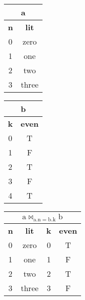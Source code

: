 \documentclass[11pt]{article}
\begin{document}
\begin{figure}
  \def\arraystretch{1.2}
  \begin{subfigure}{0.2\textwidth}
    \centering
      \begin{tabular}{|c|c|}
        \hline
        \multicolumn{2}{|c|}{a}\\
        \hline
        \textbf{n} & \textbf{lit} \\
        \hline
        0 & zero\\
        \hline
        1 & one\\
        \hline
        2 & two\\
        \hline
        3 & three\\
        \hline
      \end{tabular}
  \end{subfigure}
  \hfill
  \begin{subfigure}{0.2\textwidth}
    \centering
      \begin{tabular}{|c|c|}
        \hline
        \multicolumn{2}{|c|}{b}\\
        \hline
        \textbf{k} & \textbf{even} \\
        \hline
        0 & \textsf{T}\\
        \hline
        1 & \textsf{F}\\
        \hline
        2 & \textsf{T}\\
        \hline
        3 & \textsf{F}\\
        \hline
        4 & \textsf{T}\\
        \hline
      \end{tabular}
  \end{subfigure}
  \hfill
  \begin{subfigure}{0.4\textwidth}
    \centering
      \begin{tabular}{|c|c|c|c|}
        \hline
        \multicolumn{4}{|c|}{$\mathrm{a} \bowtie_{\mathrm{a.n} = \mathrm{b.k}} \mathrm{b}$}\\
        \hline
        \textbf{n} & \textbf{lit} & \textbf{k} & \textbf{even}\\
        \hline
        0 & zero & 0 & \textsf{T}\\
        \hline
        1 & one & 1 & \textsf{F}\\
        \hline
        2 & two & 2 & \textsf{T}\\
        \hline
        3 & three & 3 & \textsf{F}\\
        \hline
      \end{tabular}

\end{subfigure}
\end{figure}
\end{document}
